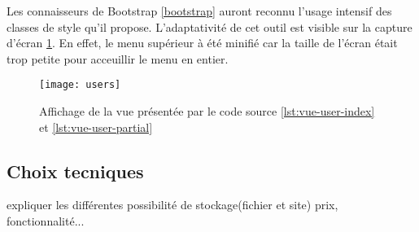 Les connaisseurs de Bootstrap \ref{bootstrap} auront reconnu l'usage intensif des classes de style qu'il propose. L'adaptativité de cet outil est visible sur la capture d'écran \ref{fig:vue-users}. En effet, le menu supérieur à été minifié car la taille de l'écran était trop petite pour acceuillir le menu en entier.

\begin{figure}
  \begin{center}
    \texttt{[image: users]}
    \caption{Affichage de la vue présentée par le code source \ref{lst:vue-user-index} et \ref{lst:vue-user-partial}}
    \label{fig:vue-users}
  \end{center}
\end{figure}

\subsection{Choix tecniques}
expliquer les différentes possibilité de stockage(fichier et site) prix, fonctionnalité...
